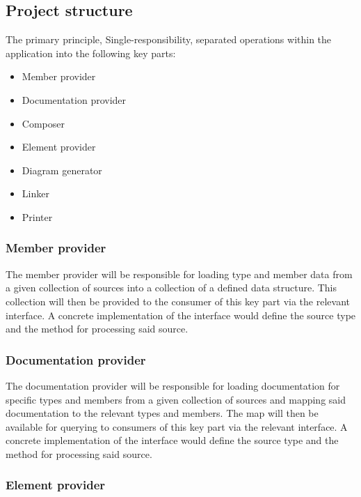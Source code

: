 \subsection{Project structure} \label{sec:projectStructure}

The primary principle, Single-responsibility, separated operations within the application into the following key parts:
\begin{itemize}
    \item Member provider
    \item Documentation provider
    \item Composer
    \item Element provider
    \item Diagram generator
    \item Linker
    \item Printer
\end{itemize}

\subsubsection{Member provider}

The member provider will be responsible for loading type and member data from a given collection of sources into a collection of a defined data structure.
This collection will then be provided to the consumer of this key part via the relevant interface.
A concrete implementation of the interface would define the source type and the method for processing said source.

\subsubsection{Documentation provider}

The documentation provider will be responsible for loading documentation for specific types and members from a given collection of sources and mapping said documentation to the relevant types and members.
The map will then be available for querying to consumers of this key part via the relevant interface.
A concrete implementation of the interface would define the source type and the method for processing said source.

\subsubsection{Element provider} \label{sec:elementProvider}

